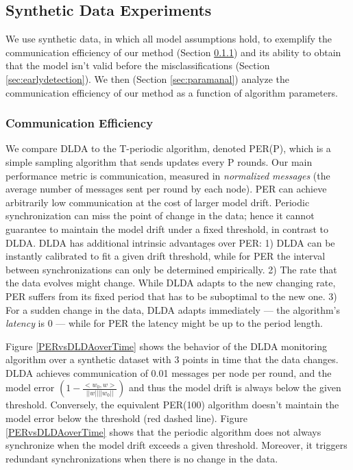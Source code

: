 \documentclass{vldb}
\begin{document}
\subsection{Synthetic Data Experiments}
We use synthetic data, in which all model assumptions hold, to
exemplify the communication efficiency of our method (Section \ref{sec:com_eff})
and its ability to obtain that the model isn't valid before the
misclassifications (Section \ref{sec:earlydetection}). We then (Section \ref{sec:paramanal}) analyze the communication efficiency of our method as a function of algorithm parameters.

\subsubsection{Communication Efficiency}\label{sec:com_eff}
We compare DLDA to the T-periodic algorithm, denoted
PER(P), which is a simple sampling algorithm that sends updates
every P rounds.
Our main performance metric is communication, measured in \textit{normalized messages} (the average number of messages sent per round by each node). 
PER can achieve arbitrarily low communication at the cost of larger model drift. 
Periodic synchronization can miss the point of change in the data; 
hence it cannot guarantee to maintain the model drift under a fixed threshold, in contrast to DLDA.  
DLDA has additional intrinsic advantages over PER: 
1) DLDA can be instantly calibrated to fit a given drift threshold, while for PER the 
interval between synchronizations can only be determined empirically. 
2) The rate that the data evolves might change. 
While DLDA adapts to the new changing rate, PER suffers from its fixed period
that has to be suboptimal to the new one.
3) For a sudden change in the data, DLDA adapts immediately --- the algorithm's
\textit{latency} is 0 --- while for PER the latency might be up to the period length.
	
Figure \ref{PERvsDLDAoverTime} shows the behavior of the DLDA monitoring
algorithm over a synthetic dataset with 3 points in time that the data changes.
DLDA achieves communication of 0.01 messages per node per round, and
the model error $(1 - \frac{<w_0,w>}{||w||||w_0||})$ and thus the model drift  is always below the given threshold.
Conversely, the equivalent PER(100) algorithm doesn't maintain the
model error below the threshold (red dashed line).
Figure \ref{PERvsDLDAoverTime} shows that the periodic algorithm does not always 
synchronize when the model drift exceeds a given threshold. 
Moreover, it triggers redundant synchronizations when there is no change in the data.
\end{document}
